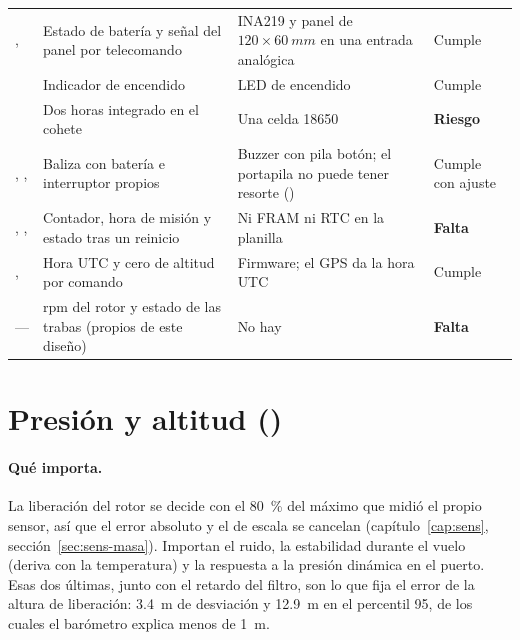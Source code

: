 \begin{table}[H]
\begin{tabularx}{\textwidth}{@{}p{1.6cm}YYp{2.0cm}@{}}
,  & Estado de batería y señal del panel por telecomando & INA219 y panel de $120\times\SI{60}{mm}$ en una entrada analógica & Cumple\\
 & Indicador de encendido & LED de encendido & Cumple\\
 & Dos horas integrado en el cohete & Una celda 18650 & \textbf{Riesgo}\\
, ,  & Baliza con batería e interruptor propios & Buzzer con pila botón; el portapila no puede tener resorte () & Cumple con ajuste\\
, ,  & Contador, hora de misión y estado tras un reinicio & Ni FRAM ni RTC en la planilla & \textbf{Falta}\\
,  & Hora UTC y cero de altitud por comando & Firmware; el GPS da la hora UTC & Cumple\\
--- & rpm del rotor y estado de las trabas (propios de este diseño) & No hay & \textbf{Falta}\\
\bottomrule
\end{tabularx}
\end{table}

\section{Presión y altitud (\texorpdfstring{}{SN1})}\label{sec:sens-pres}

\paragraph{Qué importa.} La liberación del rotor se decide con el \SI{80}{\percent} del máximo
que midió el propio sensor, así que el error absoluto y el de escala se cancelan
(capítulo~\ref{cap:sens}, sección~\ref{sec:sens-masa}). Importan el ruido, la estabilidad
durante el vuelo (deriva con la temperatura) y la respuesta a la presión dinámica en el puerto.
Esas dos últimas, junto con el retardo del filtro, son lo que fija el error de la altura de
liberación: \SI{3.4}{m} de desviación y \SI{12.9}{m} en el percentil 95, de los cuales el
barómetro explica menos de \SI{1}{m}.

